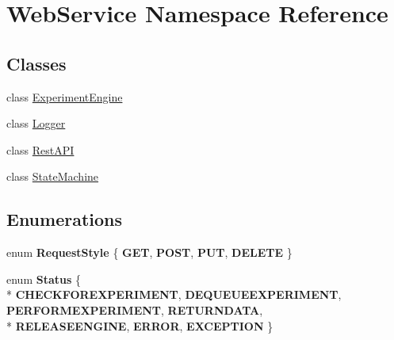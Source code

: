 \hypertarget{namespace_web_service}{}\section{Web\+Service Namespace Reference}
\label{namespace_web_service}
\subsection*{Classes}
\begin{DoxyCompactItemize}
\item 
class \hyperlink{class_web_service_1_1_experiment_engine}{Experiment\+Engine}
\item 
class \hyperlink{class_web_service_1_1_logger}{Logger}
\item 
class \hyperlink{class_web_service_1_1_rest_a_p_i}{Rest\+A\+P\+I}
\item 
class \hyperlink{class_web_service_1_1_state_machine}{State\+Machine}
\end{DoxyCompactItemize}
\subsection*{Enumerations}
\begin{DoxyCompactItemize}
\item 
\hypertarget{namespace_web_service_af58f9755d6b14948349f13fa891afacd}{}enum {\bfseries Request\+Style} \{ {\bfseries G\+E\+T}, 
{\bfseries P\+O\+S\+T}, 
{\bfseries P\+U\+T}, 
{\bfseries D\+E\+L\+E\+T\+E}
 \}\label{namespace_web_service_af58f9755d6b14948349f13fa891afacd}

\item 
\hypertarget{namespace_web_service_a8b2d52590fdda86179a15c6289333571}{}enum {\bfseries Status} \{ \\*
{\bfseries C\+H\+E\+C\+K\+F\+O\+R\+E\+X\+P\+E\+R\+I\+M\+E\+N\+T}, 
{\bfseries D\+E\+Q\+U\+E\+U\+E\+E\+X\+P\+E\+R\+I\+M\+E\+N\+T}, 
{\bfseries P\+E\+R\+F\+O\+R\+M\+E\+X\+P\+E\+R\+I\+M\+E\+N\+T}, 
{\bfseries R\+E\+T\+U\+R\+N\+D\+A\+T\+A}, 
\\*
{\bfseries R\+E\+L\+E\+A\+S\+E\+E\+N\+G\+I\+N\+E}, 
{\bfseries E\+R\+R\+O\+R}, 
{\bfseries E\+X\+C\+E\+P\+T\+I\+O\+N}
 \}\label{namespace_web_service_a8b2d52590fdda86179a15c6289333571}

\end{DoxyCompactItemize}
